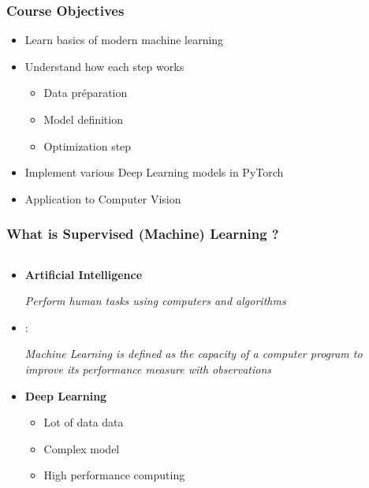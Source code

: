 \documentclass[pressentation,10pt,aspectratio=169,xcolor=table, colorlinks=true]{beamer}
\begin{document}
\begin{frame}
  \frametitle{Course Objectives}
  \begin{itemize}
  \item Learn basics of modern machine learning
  \item Understand how each step works
    \begin{itemize}
    \item Data préparation
    \item Model definition
    \item Optimization step
    \end{itemize}
  \item Implement various Deep Learning models in PyTorch
  \item Application to Computer Vision
  \end{itemize}
\end{frame}

\begin{frame}
  \frametitle{What is Supervised (Machine) Learning ?}
  \begin{columns}[c]
    \begin{column}{0.5\linewidth}
      \begin{itemize}
      \item <1-> \textbf{Artificial Intelligence}
        \centerline{\em Perform human tasks using computers and algorithms}
      \item <2-> \cite{mitchelllearning}:
        \begin{center}
          \emph{Machine Learning is defined as the capacity of a computer program to improve its performance measure with observations}
        \end{center}
      \item <3-> \textbf{Deep Learning}
        \begin{itemize}
        \item Lot of data data
        \item Complex model
        \item High performance computing
        \end{itemize}
      \end{itemize}
    \end{column}

    \begin{column}{0.5\linewidth}
      \begin{center}
      \end{center}
    \end{column}
  \end{columns}
\end{frame}
\end{document}
